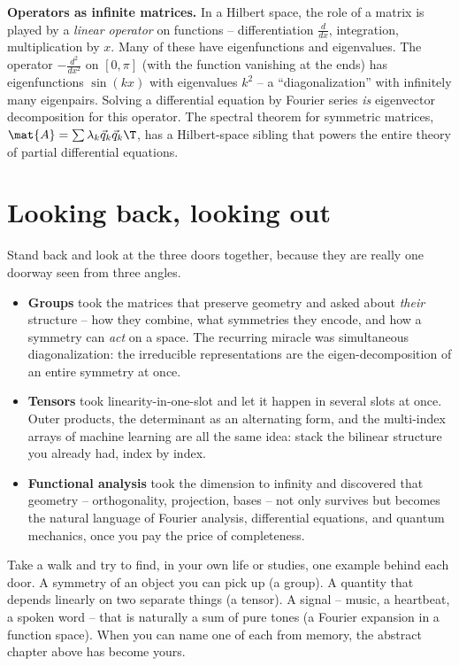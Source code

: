 \begin{connectionbox}
\textbf{Operators as infinite matrices.} In a Hilbert space, the role of a matrix is
played by a \emph{linear operator} on functions -- differentiation $\frac{d}{dx}$,
integration, multiplication by $x$. Many of these have eigenfunctions and
eigenvalues. The operator $-\frac{d^2}{dx^2}$ on $[0,\pi]$ (with the function
vanishing at the ends) has eigenfunctions $\sin(kx)$ with eigenvalues $k^2$ -- a
``diagonalization'' with infinitely many eigenpairs. Solving a differential equation
by Fourier series \emph{is} eigenvector decomposition for this operator. The
spectral theorem for symmetric matrices, $\mat{A}=\sum\lambda_k\vec{q}_k\vec{q}_k\T$,
has a Hilbert-space sibling that powers the entire theory of partial differential
equations.
\end{connectionbox}

\section{Looking back, looking out}
\label{ch37:lookback}

Stand back and look at the three doors together, because they are really one
doorway seen from three angles.

\begin{itemize}
  \item \textbf{Groups} took the matrices that preserve geometry and asked about
        \emph{their} structure -- how they combine, what symmetries they encode,
        and how a symmetry can \emph{act} on a space. The recurring miracle was
        simultaneous diagonalization: the irreducible representations are the
        eigen-decomposition of an entire symmetry at once.
  \item \textbf{Tensors} took linearity-in-one-slot and let it happen in several
        slots at once. Outer products, the determinant as an alternating form, and
        the multi-index arrays of machine learning are all the same idea: stack the
        bilinear structure you already had, index by index.
  \item \textbf{Functional analysis} took the dimension to infinity and discovered
        that geometry -- orthogonality, projection, bases -- not only survives but
        becomes the natural language of Fourier analysis, differential equations,
        and quantum mechanics, once you pay the price of completeness.
\end{itemize}

\begin{walkbox}
Take a walk and try to find, in your own life or studies, one example behind each
door. A symmetry of an object you can pick up (a group). A quantity that depends
linearly on two separate things (a tensor). A signal -- music, a heartbeat, a
spoken word -- that is naturally a sum of pure tones (a Fourier expansion in a
function space). When you can name one of each from memory, the abstract chapter
above has become yours.
\end{walkbox}

